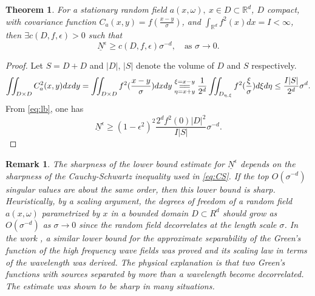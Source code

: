 \documentclass[11pt]{amsart}
\newtheorem{theorem}{Theorem}[section]
\newtheorem{remark}{Remark}[section]
\newcommand{\w}{\omega}
\begin{document}
 \begin{theorem}
 \label{th:l-scaling}
 For a stationary random field $a(x,\w), ~x\in D\subset \mathbb{R}^d$, $D$ compact, with covariance function $C_a (x,y)=f(\frac{x-y}{\sigma})$, and $\int_{\mathbb{R}^d}f^2(x)dx=I<\infty$, then $\exists c(D, f, \epsilon) >0$ such that
 \begin{equation}
 \label{eq:l-scaling}
 \underline{N}^{\epsilon} \ge c(D,f, \epsilon)\sigma^{-d}, \quad \mbox{as } \sigma \rightarrow 0.
 \end{equation}
 \end{theorem}
 \begin{proof}
 Let $S=D+D$ and $|D|$, $|S|$ denote the volume of $D$ and $S$ respectively. 
\begin{equation}
\iint_{D\times D} C_a^2(x,y)dxdy=\iint_{D\times D} f^2(\frac{x-y}{\sigma}) dxdy \underset{\eta=x+y}{\overset{\xi=x-y}{=\joinrel=}}
\frac{1}{2^d}\iint_{D_{\eta,\xi}}f^2(\frac{\xi}{\sigma})d\xi d\eta \le \frac{I|S|}{2^d}\sigma^{d}.
\end{equation}
 From \eqref{eq:lb}, one has 
 \begin{equation}
  \underline{N}^{\epsilon} \ge (1-\epsilon^2)^2 \frac{2^d f^2(0)|D|^2}{I|S|}\sigma^{-d}.
 \end{equation}

 \end{proof}

\begin{remark}
The sharpness of the lower bound estimate for $\underline{N}^{\epsilon}$ depends on the sharpness of the Cauchy-Schwartz inequality used in \eqref{eq:CS}. If the top $O(\sigma^{-d})$ singular values are about the same order, then this lower bound is sharp. Heuristically, by a scaling argument, the degrees of freedom of a random field $a(x,\omega)$ parametrized by $x$ in a bounded domain $D\subset R^d$ should grow as $O(\sigma^{-d})$ as $\sigma \rightarrow 0$ since the random field decorrelates at the length scale $\sigma$. In the work \cite{engquist11approximate}, a similar lower bound for the approximate separability of the Green's function of the high frequency wave fields was proved and its scaling law in terms of the wavelength was derived. The physical explanation is that two Green's functions with sources separated by more than a wavelength become decorrelated. The estimate was shown to be sharp in many situations. 
\end{remark}
\end{document}
